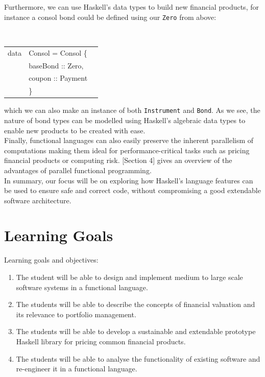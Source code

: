 \documentclass[11pt]{article}
\begin{document}
Furthermore, we can use Haskell's data types to build new financial products, for instance
a consol bond could be defined using our {\tt Zero} from above:

\begin{center}
\tt
\begin{tabular}{lll}
data & Consol = Consol \{\\
      &\hspace{-1cm} baseBond :: Zero,\\
      &\hspace{-1cm} coupon   :: Payment\\
      &\hspace{-0.8cm}\}
\end{tabular}
\end{center}

which we can also make an instance of both {\tt Instrument} and {\tt Bond}.
As we see, the nature of bond types can be modelled using Haskell's algebraic
data types to enable new products to be created with ease.\\

Finally, functional languages can also easily preserve the inherent parallelism 
of computations making them ideal for performance-critical tasks such as pricing
financial products or computing risk. \cite{hiperfit2010}[Section 4] gives an
overview of the advantages of parallel functional programming.\\

In summary, our focus will be on exploring how Haskell's language features can be used
to ensure safe and correct code, without compromising a good extendable software architecture.

\section*{Learning Goals}

Learning goals and objectives:

\begin{enumerate}
\item The student will be able to design and implement medium to large scale software systems in a functional language. %
\item The students will be able to describe the concepts of financial valuation and its relevance to portfolio management. %
\item The students will be able to develop a sustainable and extendable prototype Haskell library for pricing common financial products. %
\item The students will be able to analyse the functionality of existing software and re-engineer it in a functional language.
\end{enumerate}
\end{document}
